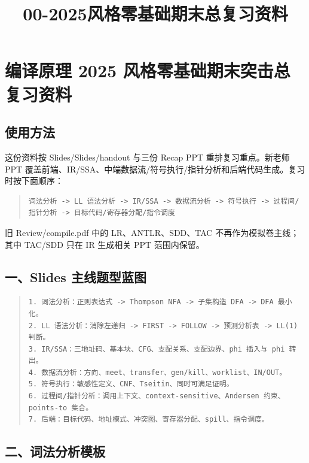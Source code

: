 \documentclass[UTF8,zihao=-4]{ctexart}
\title{00-2025风格零基础期末总复习资料}
\author{}
\date{}
\begin{document}
\maketitle
\setcounter{tocdepth}{1}
\tableofcontents
\newpage
\section{编译原理 2025 风格零基础期末突击总复习资料}


\subsection{使用方法}


这份资料按 Slides/Slides/handout 与三份 Recap PPT 重排复习重点。新老师 PPT 覆盖前端、IR/SSA、中端数据流/符号执行/指针分析和后端代码生成。复习时按下面顺序：


\begin{quote}
\footnotesize
\begin{verbatim}
词法分析 -> LL 语法分析 -> IR/SSA -> 数据流分析 -> 符号执行 -> 过程间/指针分析 -> 目标代码/寄存器分配/指令调度
\end{verbatim}
\end{quote}


旧 Review/compile.pdf 中的 LR、ANTLR、SDD、TAC 不再作为模拟卷主线；其中 TAC/SDD 只在 IR 生成相关 PPT 范围内保留。


\subsection{一、Slides 主线题型蓝图}


\begin{quote}
\footnotesize
\begin{verbatim}
1. 词法分析：正则表达式 -> Thompson NFA -> 子集构造 DFA -> DFA 最小化。
2. LL 语法分析：消除左递归 -> FIRST -> FOLLOW -> 预测分析表 -> LL(1) 判断。
3. IR/SSA：三地址码、基本块、CFG、支配关系、支配边界、phi 插入与 phi 转出。
4. 数据流分析：方向、meet、transfer、gen/kill、worklist、IN/OUT。
5. 符号执行：敏感性定义、CNF、Tseitin、同时可满足证明。
6. 过程间/指针分析：调用上下文、context-sensitive、Andersen 约束、points-to 集合。
7. 后端：目标代码、地址模式、冲突图、寄存器分配、spill、指令调度。
\end{verbatim}
\end{quote}


\subsection{二、词法分析模板}
\end{document}
